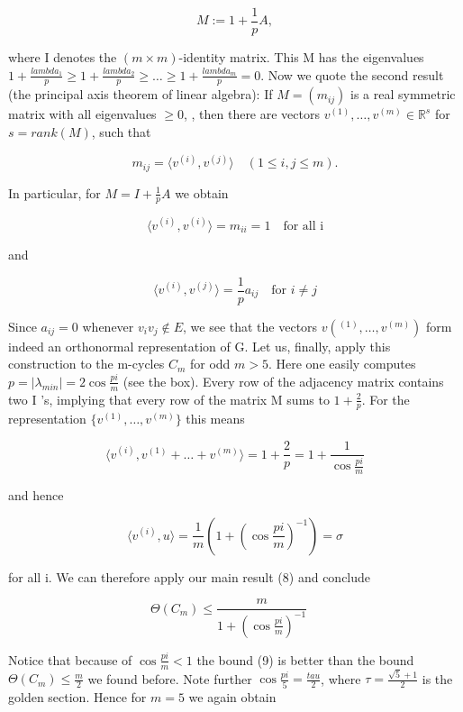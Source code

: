\documentclass[12pt]{memoir}
\newcommand{\setnewpagemargins}{
    \clearpage
    \checkandfixthelayout
}
\begin{document}
\[
M := 1 + {\frac{1}{p}}A,
\]

where I denotes the $(m \times m)$-identity matrix. This M has the eigenvalues
$1+{\frac{lambda_1}{p}} \geq 1+{\frac{lambda_2}{p}} \geq \ldots \geq 1+{\frac{lambda_m}{p}} =0$. Now we quote the second result (the
principal axis theorem of linear algebra): If $M = (m_{ij})$ is a real symmetric 
matrix with all eigenvalues $\geq 0$, , then there are vectors $v^{(1)}, \ldots, v^{(m)} \in \mathbb{R}^s$
for $s = rank(M)$, such that 

\[
m_{ij} = \langle v^{(i)}, v^{(j)} \rangle  \quad  (1 \leq i,j \leq m).
\]

In particular, for $M = I + {\frac{1}{p}}A$ we obtain

\[
\langle v^{(i)}, v^{(i)} \rangle = m_{ii} = 1  \quad \text{for all i}
\]

and

\[
\langle v^{(i)}, v^{(j)} \rangle = {\frac{1}{p}}a_{ij} \quad \text{for $i \neq j$}
\]

Since $a_{ij} = 0 $ whenever $ v_i v_j \notin E$, we see that the vectors $v(^{(1)},\ldots,v^{(m)})$
form indeed an orthonormal representation of G. 
Let us, finally, apply this construction to the m-cycles $C_m$ for odd $m > 5$. 
Here one easily computes $p = |\lambda_{min}| = 2\cos{\frac{pi}{m}}$ (see the box). Every 
row of the adjacency matrix contains two I 's, implying that every row of 
the matrix M sums to $1 + {\frac{2}{p}}$. For the representation $\{ v^{(1)}, \ldots, v^{(m)}\}$ this
means

\[ 
    \langle v^{(i)},v^{(1)}+ \ldots + v^{(m)} \rangle=1+{\frac{2}{p}}=1+{\frac{1}{\cos{\frac{pi}{m}}}}
\]

and hence 

\[
\langle v^{(i)},u \rangle = {\frac{1}{m}}(1+(\cos{\frac{pi}{m}})^{-1})=\sigma
\]

for all i. We can therefore apply our main result (8) and conclude

\begin{equation}
    \Theta(C_m) \leq {\frac{m}{1+(\cos{\frac{pi}{m}})^{-1}}} \quad \label{nine}    
\end{equation}


\setnewpagemargins

Notice that because of $\cos{\frac{pi}{m}} < 1$ the bound (9) is better than the bound 
$\Theta(C_m) \leq {\frac{m}{2}}$ we found before. Note further $\cos{\frac{pi}{5}} = {\frac{tau}{2}}$, where $\tau = {\frac{\sqrt{5}+1}{2}}$
is the golden section. Hence for $m = 5$ we again obtain
\end{document}
